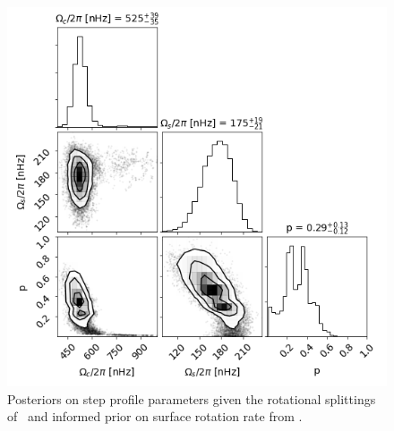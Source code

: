 \begin{figure}
\centering
    \includegraphics[width=\textwidth]{Figures/subgiant_chapter_figures/22_corner.png}
    \caption{Posteriors on step profile parameters given the rotational splittings of \thestar\ and informed prior on surface rotation rate from \citep{garcia_rotation_2014}. }
    \label{fig:kic12408433_with_surface_rotation_prior}
\end{figure}


